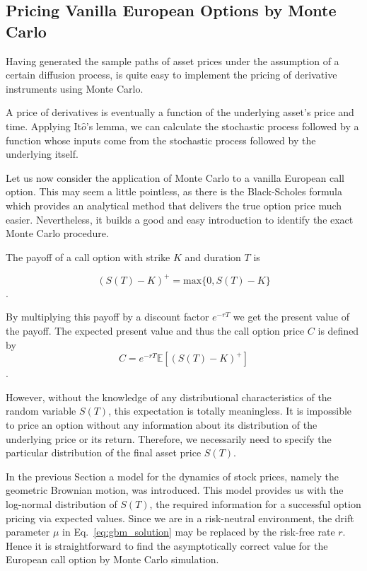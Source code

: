 \subsection{Pricing Vanilla European Options by Monte Carlo}
Having generated the sample paths of asset prices under the assumption of a 
certain diffusion process, is quite easy to implement the pricing of
derivative instruments using Monte Carlo. 

A price of derivatives is eventually a function of the underlying 
asset's price and time. Applying It$\hat{o}$'s
lemma, we can calculate the stochastic process followed by a function
whose inputs come from the stochastic process followed by the underlying
itself.

Let us now consider the application of Monte Carlo to a
vanilla European call option. This may seem a little pointless, as there
is the Black-Scholes formula which provides an analytical method that delivers the
true option price much easier. Nevertheless, it builds a good and easy
introduction to identify the exact Monte Carlo procedure. 

The payoff of a call option with strike $K$ and duration $T$ is 

\begin{equation}
(S(T)−K)^+ = \textrm{max}\{0,S(T)−K\}
\end{equation}. 

By multiplying this payoff by a discount factor $e^{−rT}$ we get 
the present value of the payoff. 
The expected present value and thus the call option price $C$ is defined 
by
\begin{equation} 
C = e^{−rT} \mathbb{E}[(S(T) −K)^+ ]
\label{eq:call_payoff}
\end{equation}. 

However, without the knowledge of any distributional
characteristics of the random variable $S(T)$, this expectation is totally
meaningless. It is impossible to price an option without any information
about its distribution of the underlying price or its return. Therefore,
we necessarily need to specify the particular distribution of the final
asset price $S(T)$. 

In the previous Section a model for the dynamics of
stock prices, namely the geometric Brownian motion, was introduced. This
model provides us with the log-normal distribution of $S(T)$, the required
information for a successful option pricing via expected values. Since
we are in a risk-neutral environment, the drift parameter $\mu$ in Eq.~\ref{eq:gbm_solution}
may be replaced by the risk-free rate $r$. Hence it is
straightforward to find the asymptotically correct value for the
European call option by Monte Carlo simulation. 

